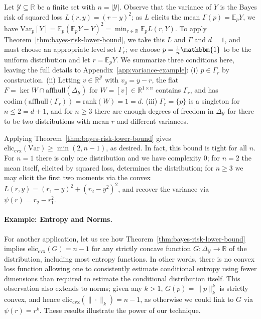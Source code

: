 \documentclass{article}
\newcommand{\reals}{\mathbb{R}}
\newcommand{\simplex}{\Delta_\Y}
\newcommand{\eliccvx}{\mathrm{elic}_\mathrm{cvx}}
\newcommand{\codim}{\mathrm{codim}}
\newcommand{\rank}{\mathrm{rank}}
\newcommand{\affhull}{\mathrm{affhull}}
\newcommand{\E}{\mathbb{E}}
\newcommand{\Y}{\mathcal{Y}}
\newcommand{\Var}{\mathrm{Var}}
\newcommand{\ones}{\mathbbm{1}}
\begin{document}
Let $\Y\subseteq\reals$ be a finite set with $n=|\Y|$.
Observe that the variance of $Y$ is the Bayes risk of squared loss $L(r,y) = (r-y)^2$; as $L$ elicits the mean $\Gamma(p) = \E_p Y$, we have $\Var_p[Y] = \E_p (\E_pY - Y)^2 = \min_{r\in\reals} \E_p L(r,Y)$.
To apply Theorem~\ref{thm:bayes-risk-lower-bound}, we take this $L$ and $\Gamma$ and $d=1$, and must choose an appropriate level set $\Gamma_r$; we choose $p = \tfrac 1 n \ones$ to be the uniform distribution and let $r=\E_pY$.
We summarize three conditions here, leaving the full details to Appendix~\ref{app:variance-example}:
(i) $p\in\Gamma_r$ by construction.
(ii) Letting $v\in\reals^\Y$ with $v_y = y - r$, the flat $F = \ker W \cap \affhull(\simplex)$ for $W = [v]\in\reals^{1\times n}$ contains $\Gamma_r$, and has $\codim(\affhull(\Gamma_r)) = \rank(W) = 1 = d$.
(iii)
$\Gamma_r=\{p\}$ is a singleton for $n \leq 2 = d+1$, and for $n\geq 3$ there are enough degrees of freedom in $\simplex$ for there to be two distributions with mean $r$ and different variances.

Applying Theorem~\ref{thm:bayes-risk-lower-bound} gives $\eliccvx(\Var) \geq \min(2,n-1)$, as desired.
In fact, this bound is tight for all $n$.
For $n=1$ there is only one distribution and we have complexity $0$; for $n=2$ the mean itself, elicited by squared loss, determines the distribution; for $n\geq 3$ we may elicit the first two moments via the convex $L(r,y) = (r_1-y)^2 + (r_2-y^2)^2$, and recover the variance via $\psi(r) = r_2-r_1^2$.

\paragraph{Example: Entropy and Norms.}
For another application, let us see how Theorem~\ref{thm:bayes-risk-lower-bound} implies $\eliccvx(G) = n-1$ for any strictly concave function $G:\simplex\to\reals$ of the distribution, including most entropy functions.
In other words, there is no convex loss function allowing one to consistently estimate conditional entropy using fewer dimensions than required to estimate the conditional distribution itself.
This observation also extends to norms; given any $k>1$, $G(p) = \|p\|_k^k$ is strictly convex, and hence $\eliccvx(\|\cdot\|_k) = n-1$, as otherwise we could link to $G$ via $\psi(r) = r^k$.
These results illustrate the power of our technique.
\end{document}
